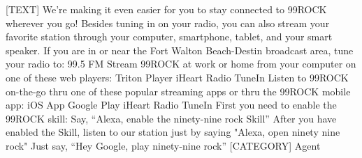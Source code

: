 [TEXT]
We're making it even easier for you to stay connected to 99ROCK wherever you go! Besides tuning 
    in on your radio, you can also stream your favorite station through your computer, smartphone, 
    tablet, and your smart speaker.
If you are in or near the Fort Walton Beach-Destin broadcast area, tune your radio to: 99.5 FM
Stream 99ROCK at work or home from your computer on one of these web players: Triton Player iHeart 
    Radio TuneIn
Listen to 99ROCK on-the-go thru one of these popular streaming apps or thru the 99ROCK mobile 
    app: iOS App Google Play iHeart Radio TuneIn
First you need to enable the 99ROCK skill:
Say, ``Alexa, enable the ninety-nine rock Skill''
After you have enabled the Skill, listen to our station just by saying "Alexa, open ninety nine 
    rock"
Just say, ``Hey Google, play ninety-nine rock''
[CATEGORY]
Agent